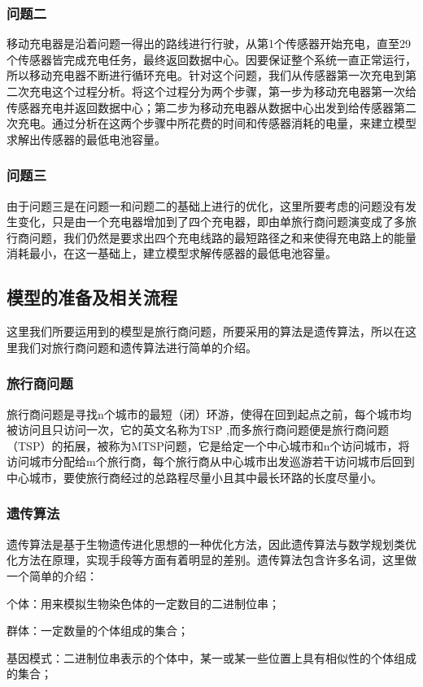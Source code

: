 \documentclass{article}
\begin{document}
\subsubsection{问题二}
移动充电器是沿着问题一得出的路线进行行驶，从第1个传感器开始充电，直至29个传感器皆完成充电任务，最终返回数据中心。因要保证整个系统一直正常运行，所以移动充电器不断进行循环充电。针对这个问题，我们从传感器第一次充电到第二次充电这个过程分析。将这个过程分为两个步骤，第一步为移动充电器第一次给传感器充电并返回数据中心；第二步为移动充电器从数据中心出发到给传感器第二次充电。通过分析在这两个步骤中所花费的时间和传感器消耗的电量，来建立模型求解出传感器的最低电池容量。
\subsubsection{问题三}
由于问题三是在问题一和问题二的基础上进行的优化，这里所要考虑的问题没有发生变化，只是由一个充电器增加到了四个充电器，即由单旅行商问题演变成了多旅行商问题，我们仍然是要求出四个充电线路的最短路径之和来使得充电路上的能量消耗最小，在这一基础上，建立模型求解传感器的最低电池容量。
\subsection{模型的准备及相关流程}
这里我们所要运用到的模型是旅行商问题，所要采用的算法是遗传算法，所以在这里我们对旅行商问题和遗传算法进行简单的介绍。
\subsubsection{旅行商问题}
旅行商问题是寻找n个城市的最短（闭）环游，使得在回到起点之前，每个城市均被访问且只访问一次，它的英文名称为TSP\cite{ref1} ,而多旅行商问题便是旅行商问题（TSP）的拓展，被称为MTSP问题，它是给定一个中心城市和n个访问城市，将访问城市分配给m个旅行商，每个旅行商从中心城市出发巡游若干访问城市后回到中心城市，要使旅行商经过的总路程尽量小且其中最长环路的长度尽量小\cite{ref2}。
\subsubsection{遗传算法}
遗传算法是基于生物遗传进化思想的一种优化方法，因此遗传算法与数学规划类优化方法在原理，实现手段等方面有着明显的差别。遗传算法包含许多名词，这里做一个简单的介绍：

个体：用来模拟生物染色体的一定数目的二进制位串；

群体：一定数量的个体组成的集合；

基因模式：二进制位串表示的个体中，某一或某一些位置上具有相似性的个体组成的集合；
\end{document}
